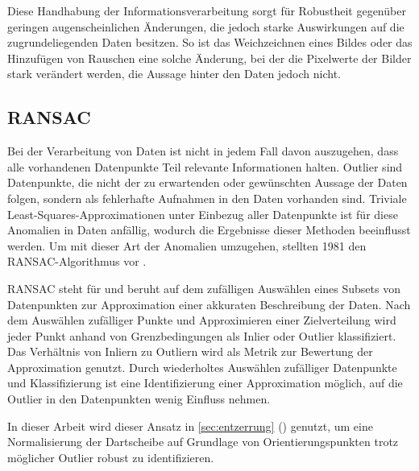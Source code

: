 Diese Handhabung der Informationsverarbeitung sorgt für Robustheit gegenüber geringen augenscheinlichen Änderungen, die jedoch starke Auswirkungen auf die zugrundeliegenden Daten besitzen. So ist das Weichzeichnen eines Bildes oder das Hinzufügen von Rauschen eine solche Änderung, bei der die Pixelwerte der Bilder stark verändert werden, die Aussage hinter den Daten jedoch nicht.


\subsection{RANSAC}
\label{sec:ransac}

Bei der Verarbeitung von Daten ist nicht in jedem Fall davon auszugehen, dass alle vorhandenen Datenpunkte Teil relevante Informationen halten. Outlier sind Datenpunkte, die nicht der zu erwartenden oder gewünschten Aussage der Daten folgen, sondern als fehlerhafte Aufnahmen in den Daten vorhanden sind. Triviale Least-Squares-Approximationen unter Einbezug aller Datenpunkte ist für diese Anomalien in Daten anfällig, wodurch die Ergebnisse dieser Methoden beeinflusst werden. Um mit dieser Art der Anomalien umzugehen, stellten \citeauthor{ransac} 1981 den RANSAC-Algorithmus vor \cite{ransac,cv_general}.

RANSAC steht für  und beruht auf dem zufälligen Auswählen eines Subsets von Datenpunkten zur Approximation einer akkuraten Beschreibung der Daten. Nach dem Auswählen zufälliger Punkte und Approximieren einer Zielverteilung wird jeder Punkt anhand von Grenzbedingungen als Inlier oder Outlier klassifiziert. Das Verhältnis von Inliern zu Outliern wird als Metrik zur Bewertung der Approximation genutzt. Durch wiederholtes Auswählen zufälliger Datenpunkte und Klassifizierung ist eine Identifizierung einer Approximation möglich, auf die Outlier in den Datenpunkten wenig Einfluss nehmen.

In dieser Arbeit wird dieser Ansatz in \autoref{sec:entzerrung} () genutzt, um eine Normalisierung der Dartscheibe auf Grundlage von Orientierungspunkten trotz möglicher Outlier robust zu identifizieren.
